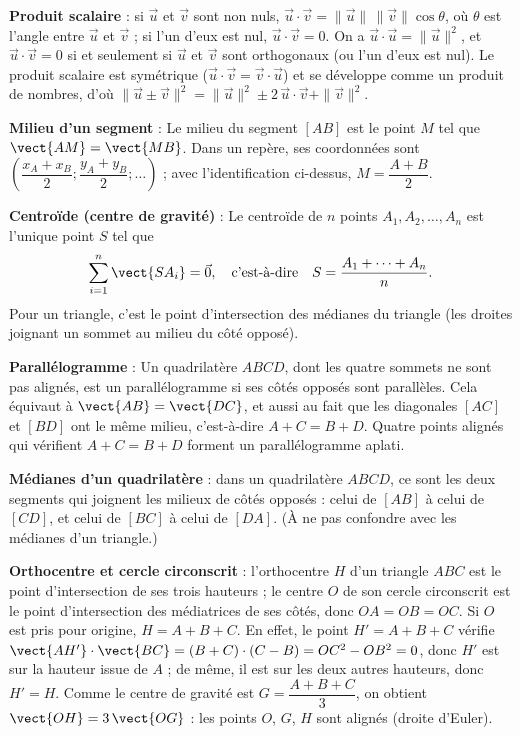 \textbf{Produit scalaire} : si $\vec{u}$ et $\vec{v}$ sont non nuls, $\vec{u}\cdot\vec{v}=\|\vec{u}\|\,\|\vec{v}\|\cos\theta$, où $\theta$ est l'angle entre $\vec{u}$ et $\vec{v}$ ; si l'un d'eux est nul, $\vec{u}\cdot\vec{v}=0$. On a $\vec{u}\cdot\vec{u}=\|\vec{u}\|^2$, et $\vec{u}\cdot\vec{v}=0$ si et seulement si $\vec{u}$ et $\vec{v}$ sont orthogonaux (ou l'un d'eux est nul). Le produit scalaire est symétrique ($\vec{u}\cdot\vec{v}=\vec{v}\cdot\vec{u}$) et se développe comme un produit de nombres, d'où $\|\vec{u}\pm\vec{v}\|^2=\|\vec{u}\|^2\pm2\,\vec{u}\cdot\vec{v}+\|\vec{v}\|^2$.

\textbf{Milieu d'un segment} : Le milieu du segment $[AB]$ est le point $M$ tel que $\vect{AM} = \vect{MB}$. Dans un repère, ses coordonnées sont $ \left( \dfrac{x_A+x_B}{2} ; \dfrac{y_A+y_B}{2} ; \ldots \right)$ ; avec l'identification ci-dessus, $M=\dfrac{A+B}{2}$.

\textbf{Centroïde (centre de gravité)} : Le centroïde de $n$ points $A_1, A_2, \ldots, A_n$ est l'unique point $S$ tel que
\[
\sum_{i=1}^{n} \vect{SA_i} = \vec{0},
\quad\text{c'est-à-dire}\quad S=\frac{A_1+\cdots+A_n}{n}.
\]
Pour un triangle, c'est le point d'intersection des médianes du triangle (les droites joignant un sommet au milieu du côté opposé).

\textbf{Parallélogramme} : Un quadrilatère $ABCD$, dont les quatre sommets ne sont pas alignés, est un parallélogramme si ses côtés opposés sont parallèles. Cela équivaut à $\vect{AB}=\vect{DC}$, et aussi au fait que les diagonales $[AC]$ et $[BD]$ ont le même milieu, c'est-à-dire $A+C=B+D$. Quatre points alignés qui vérifient $A+C=B+D$ forment un parallélogramme aplati.

\textbf{Médianes d'un quadrilatère} : dans un quadrilatère $ABCD$, ce sont les deux segments qui joignent les milieux de côtés opposés : celui de $[AB]$ à celui de $[CD]$, et celui de $[BC]$ à celui de $[DA]$. (À ne pas confondre avec les médianes d'un triangle.)

\textbf{Orthocentre et cercle circonscrit} : l'orthocentre $H$ d'un triangle $ABC$ est le point d'intersection de ses trois hauteurs ; le centre $O$ de son cercle circonscrit est le point d'intersection des médiatrices de ses côtés, donc $OA=OB=OC$. Si $O$ est pris pour origine, $H=A+B+C$. En effet, le point $H'=A+B+C$ vérifie $\vect{AH'}\cdot\vect{BC}=(B+C)\cdot(C-B)=OC^2-OB^2=0$, donc $H'$ est sur la hauteur issue de $A$ ; de même, il est sur les deux autres hauteurs, donc $H'=H$. Comme le centre de gravité est $G=\dfrac{A+B+C}{3}$, on obtient $\vect{OH}=3\,\vect{OG}$ : les points $O$, $G$, $H$ sont alignés (droite d'Euler).

